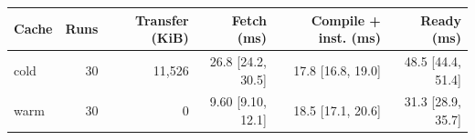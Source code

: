 \begin{tabular}{lrrrrr}
\hline
Cache & Runs & Transfer (KiB) & Fetch (ms) & Compile + inst. (ms) & Ready (ms) \\
\hline
cold & 30 & 11,526 & 26.8 [24.2, 30.5] & 17.8 [16.8, 19.0] & 48.5 [44.4, 51.4] \\
warm & 30 & 0 & 9.60 [9.10, 12.1] & 18.5 [17.1, 20.6] & 31.3 [28.9, 35.7] \\
\hline
\end{tabular}
